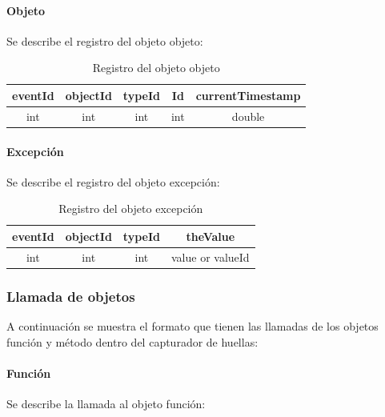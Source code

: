 \documentclass[12pt,legalpaper]{report}
\begin{document}
				\paragraph{Objeto}

Se describe el registro del objeto objeto:
\newline

\begin{table}[!h]
\begin{center}
\begin{tabular}{| c | c | c | c | c |}
\hline
\rowcolor[gray]{0.9}eventId & objectId & typeId & Id & currentTimestamp\\
\hline
int & int & int & int & double\\
\hline
\end{tabular}
\caption{Registro del objeto objeto} 
\end{center}
\end{table}
				\paragraph{Excepción}

Se describe el registro del objeto excepción: \\

\begin{table}[!h]
\begin{center}
\begin{tabular}{| c | c | c | c |}
\hline
\rowcolor[gray]{0.9}eventId & objectId & typeId & theValue\\
\hline
int & int & int & value or valueId\footnotemark[1]\\
\hline
\end{tabular}
\caption{Registro del objeto excepción} 
\end{center}
\end{table}



			\subsubsection{Llamada de objetos}

A continuación se muestra el formato que tienen las llamadas de los objetos función y método dentro del capturador de huellas:\\

				\paragraph{Función}
Se describe la llamada al objeto función:\\
\end{document}
